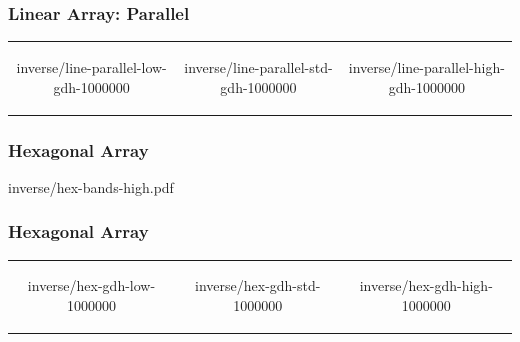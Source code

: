 \begin{frame}\frametitle{Linear Array: Parallel}
\begin{table}[htp]
\begin{center}
	\begin{tabular}{ccc}
		\begin{overpic}[ scale = 0.325 ] {\pLocalGraphics inverse/line-parallel-low-gdh-1000000} \end{overpic} &
		\begin{overpic}[ scale = 0.325 ] {\pLocalGraphics inverse/line-parallel-std-gdh-1000000} \end{overpic} &
		\begin{overpic}[ scale = 0.325 ] {\pLocalGraphics inverse/line-parallel-high-gdh-1000000} \end{overpic} 
	\end{tabular}
\end{center}
\end{table}%
\end{frame}
%
%
\begin{frame}\frametitle{Hexagonal Array}
\center
	\begin{overpic}[ scale = 0.55 ]
		{\pLocalGraphics inverse/hex-bands-high.pdf}
	\end{overpic}
\end{frame}
%
\begin{frame}\frametitle{Hexagonal Array}
\begin{table}[htp]
\begin{center}
	\begin{tabular}{ccc}
		\begin{overpic}[ scale = 0.325 ] {\pLocalGraphics inverse/hex-gdh-low-1000000} \end{overpic} &
		\begin{overpic}[ scale = 0.325 ] {\pLocalGraphics inverse/hex-gdh-std-1000000} \end{overpic} &
		\begin{overpic}[ scale = 0.325 ] {\pLocalGraphics inverse/hex-gdh-high-1000000} \end{overpic} 
	\end{tabular}
\end{center}
\end{table}%
\end{frame}

